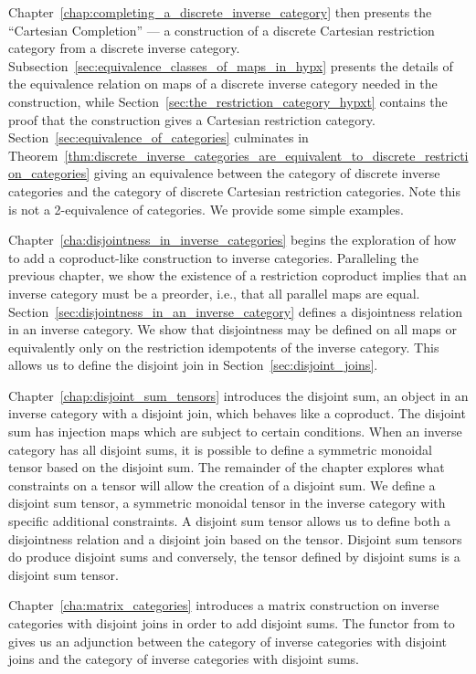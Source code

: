 Chapter~\ref{chap:completing_a_discrete_inverse_category} then presents the ``Cartesian
Completion'' --- a construction of a discrete Cartesian restriction category from a discrete
inverse category. Subsection~\ref{sec:equivalence_classes_of_maps_in_hypx} presents the details of the
equivalence relation on  maps of a discrete inverse category needed in the construction, while
Section~\ref{sec:the_restriction_category_hypxt} contains the proof that the construction gives a
Cartesian restriction category. Section~\ref{sec:equivalence_of_categories} culminates in
Theorem~\ref{thm:discrete_inverse_categories_are_equivalent_to_discrete_restriction_categories}
giving an equivalence between the category of discrete inverse categories and the
category of discrete Cartesian restriction categories. Note this is not a 2-equivalence
of categories. We provide some simple examples.


Chapter~\ref{cha:disjointness_in_inverse_categories} begins the exploration of how to add a
coproduct-like construction to inverse categories. Paralleling the previous chapter, we show the
existence of a restriction coproduct implies that an inverse category must be a preorder, i.e.,
that all parallel maps are equal. Section~\ref{sec:disjointness_in_an_inverse_category} defines a
disjointness relation in an inverse category. We show that disjointness may be defined on all maps
or equivalently only on the restriction idempotents of the inverse category. This allows us to
define the disjoint join in Section~\ref{sec:disjoint_joins}.

Chapter~\ref{chap:disjoint_sum_tensors} introduces the disjoint sum, an object in an inverse
category with a disjoint join, which behaves like a coproduct. The disjoint sum has injection maps
which are subject to certain conditions. When an inverse category has all disjoint sums, it is
possible to define a symmetric monoidal tensor based on the disjoint sum. The remainder of the
chapter explores what constraints on a tensor will allow the creation of  a disjoint sum. We define
a disjoint sum tensor, a symmetric monoidal tensor in the inverse category with specific additional
constraints. A disjoint sum tensor allows us to define both a disjointness relation and a disjoint
join based on the tensor. Disjoint sum tensors do produce disjoint sums and conversely, the tensor
defined by disjoint sums is a disjoint sum tensor.

Chapter~\ref{cha:matrix_categories} introduces a matrix construction on inverse categories with
disjoint joins in order to add disjoint sums. The functor from \X to \imatx gives us an adjunction
between the category of inverse categories with disjoint joins and the
category of inverse categories with disjoint sums.

